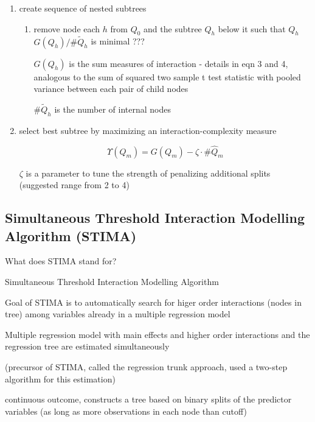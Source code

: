 \documentclass[10pt]{article}
\begin{document}
\begin{enumerate}
  \item create sequence of nested subtrees
  \begin{enumerate}
    \item remove node each $h$ from $Q_0$ and the subtree $Q_h$ below it such that $Q_h$ $G(Q_h)/\#\tilde{Q}_h$ is minimal ???
    
    $G(Q_{h})$ is the sum measures of interaction - details in eqn 3 and 4,   analogous to the sum of squared two sample t test statistic with pooled variance between each pair of child nodes

    $\#\tilde{Q}_{h}$ is the number of internal nodes
  \end{enumerate}
  \item select best subtree by maximizing an interaction-complexity measure
  
  \[
  \Upsilon(Q_{m}) = G(Q_{m}) - \zeta \cdot \#\hat{Q}_{m}
  \]
  
  $\zeta$ is a parameter to tune the strength of penalizing additional splits (suggested range from 2 to 4)
\end{enumerate}

\hrulefill


\subsection{Simultaneous Threshold Interaction Modelling Algorithm (STIMA)} %
\label{sub:STIMA}

\hrulefill

What does STIMA stand for?

Simultaneous Threshold Interaction Modelling Algorithm

\hrulefill

Goal of STIMA is to automatically search for higer order interactions (nodes in tree) among variables already in a multiple regression model

Multiple regression model with main effects and higher order interactions and the regression tree are estimated simultaneously

(precursor of STIMA, called the regression trunk approach, used a two-step algorithm for this estimation)

continuous outcome, constructs a tree based on binary splits of the predictor variables (as long as more observations in each node than cutoff)
\end{document}
